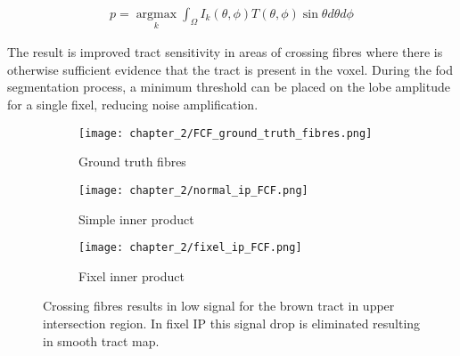 \begin{align}
  p = \operatorname*{argmax}_k \int_\Omega I_k(\theta,\phi) T(\theta,\phi) \sin\theta d\theta d\phi
\end{align}

The result is improved tract sensitivity in areas of crossing fibres where there is otherwise sufficient evidence that the tract is present in the voxel.
During the \gls{fod} segmentation process, a minimum threshold can be placed on the lobe amplitude for a single fixel, reducing noise amplification.

\begin{figure}
  \centering
  \begin{subfigure}[b]{0.3\textwidth}
  \centering
  \texttt{[image: chapter\_2/FCF\_ground\_truth\_fibres.png]}
  \caption{Ground truth fibres}
  \label{}
  \end{subfigure}%
  \begin{subfigure}[b]{0.3\textwidth}
  \texttt{[image: chapter\_2/normal\_ip\_FCF.png]}
  \caption{Simple inner product}
  \label{}
  \end{subfigure}%
  \begin{subfigure}[b]{0.3\textwidth}
  \texttt{[image: chapter\_2/fixel\_ip\_FCF.png]}
  \caption{Fixel inner product}
  \label{}
  \end{subfigure}
  \caption{Crossing fibres results in low signal for the brown tract in upper intersection region. In fixel IP this signal drop is eliminated resulting in smooth tract map.}\label{fig:fixip}
\end{figure}
